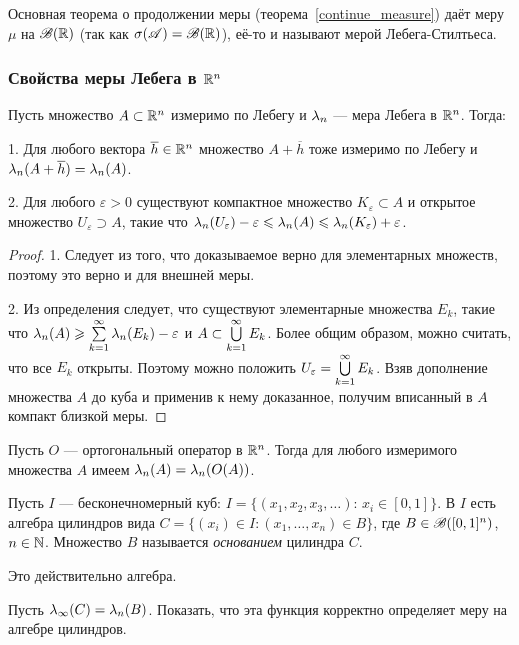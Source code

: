 \documentclass[10pt]{article}
\newcommand{\ve}{\varepsilon}
\begin{document}
Основная теорема о продолжении меры (теорема~\ref{continue_measure})
даёт меру $\mu$ на $\mathscr{B}(\mathbb{R})$ (так как $\sigma(\mathscr{A})=\mathscr{B}(\mathbb{R})$), её-то и
называют мерой Лебега-Стилтьеса.

\subsubsection{Свойства меры Лебега в $\mathbb{R}^n$}


\begin{prop} Пусть множество $A\subset\mathbb{R}^n$ измеримо по Лебегу и
$\lambda_n$ --- мера Лебега в $\mathbb{R}^n$. Тогда:

1. Для любого вектора $\overline h\in\mathbb{R}^n$ множество $A+\overline h$
тоже измеримо по Лебегу и $\lambda_n(A+\overline h)=\lambda_n(A)$.

2. Для любого $\ve>0$ существуют компактное множество
$K_{\ve}\subset A$ и открытое множество $U_{\ve}\supset A$, такие
что $\la_n(U_{\ve})-\ve\le\la_n(A)\le\la_n(K_{\ve})+\ve$.
\end{prop}

\begin{proof}
1. Следует из того, что доказываемое верно для элементарных
множеств, поэтому это верно и для внешней меры.

2. Из определения следует, что существуют элементарные множества
$E_k$, такие что $\la_n(A)\ge\sumkui\la_n(E_k)\bw -\ve$ и
$A\subset\bigcup\limits_{k=1}^{\infty} E_k$. Более общим образом, можно считать, что все
$E_k$ открыты. Поэтому можно положить $U_{\ve}=\cupkui E_k$. Взяв
дополнение множества $A$ до куба и применив к нему доказанное,
получим вписанный в $A$ компакт близкой меры.
\end{proof}

\begin{problem}
Пусть $O$ --- ортогональный оператор в $\mathbb{R}^n$. Тогда для любого
измеримого множества $A$ имеем $\lambda_n(A)=\lambda_n(O(A))$.
\end{problem}

\begin{ex}
Пусть $I$ --- бесконечномерный куб:
$I=\{(x_1,x_2,x_3,\ldots):\,x_i\in[0,1]\}$. В $I$ есть алгебра
цилиндров вида $C=\{(x_i)\in I:(x_1,\ldots,x_n)\in B\}$, где
$B\in\mathscr{B}([0,1]^n)$, $n\in\mathbb{N}$. Множество $B$ называется
\emph{основанием} цилиндра $C$.
\end{ex}

\begin{problem}
Это действительно алгебра.
\end{problem}
\begin{problem}
Пусть $\lambda_\infty(C)=\lambda_n(B)$. Показать, что эта функция корректно
определяет меру на алгебре цилиндров.
\end{problem}
\end{document}
